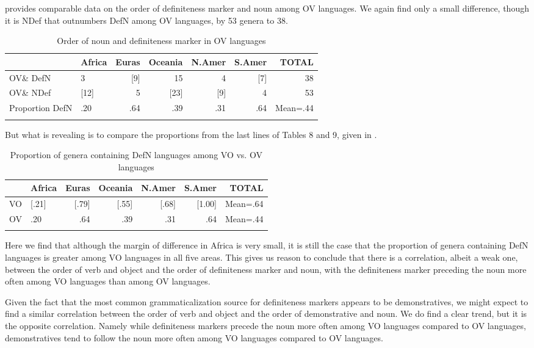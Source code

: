 \documentclass[output=paper]{langsci/langscibook}
\begin{document}
 provides comparable data on the order of definiteness marker and noun among OV languages.  We again find only a small difference, though it is NDef that outnumbers DefN among OV languages, by 53 genera to 38.

\begin{table}
\begin{tabularx}{\textwidth}{Xlrrrrr} 
\lsptoprule
& \bfseries Africa & \bfseries Euras & \bfseries Oceania & \bfseries N.Amer & \bfseries S.Amer & \bfseries TOTAL\\
\midrule
OV\& DefN & 3 & [9] & 15 & 4 & [7] & 38\\
OV\& NDef & [12] & 5 & [23] & [9] & 4 & 53\\
Proportion DefN & .20 & .64 & .39 & .31 & .64 & Mean=.44\\
\lspbottomrule
\end{tabularx}

\caption{Order of noun and definiteness marker in OV languages}
\label{tab:dryer:9}
\end{table}

But what is revealing is to compare the proportions from the last lines of Tables 8 and 9, given in .

\begin{table}
\begin{tabularx}{\textwidth}{Xlrrrrr} 
\lsptoprule
& \bfseries Africa & \bfseries Euras & \bfseries Oceania & \bfseries N.Amer & \bfseries S.Amer & \bfseries TOTAL\\
\midrule 
VO & [.21] & [.79] & [.55] & [.68] & [1.00] & Mean=.64\\
OV & .20 & .64 & .39 & .31 & .64 & Mean=.44\\
\lspbottomrule
\end{tabularx}
\caption{\label{tab:dryer:10} Proportion of genera containing DefN languages among VO vs. OV languages}
\end{table}


Here we find that although the margin of difference in Africa is very small, it is still the case that the proportion of genera containing DefN languages is greater among VO languages in all five areas. This gives us reason to conclude that there is a correlation, albeit a weak one, between the order of verb and object and the order of definiteness marker and noun, with the definiteness marker preceding the noun more often among VO languages than among OV languages.

Given the fact that the most common grammaticalization source for definiteness markers appears to be demonstratives, we might expect to find a similar correlation between the order of verb and object and the order of demonstrative and noun. We do find a clear trend, but it is the opposite correlation. Namely while definiteness markers precede the noun more often among VO languages compared to OV languages, demonstratives tend to follow the noun more often among VO languages compared to OV languages.
\end{document}
